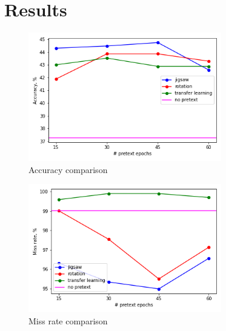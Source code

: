 \section{Results}

\begin{center}

    \begin{figure}[h]
        \centering
        \includegraphics[width=0.75\textwidth]{images/acc}
        \caption{\label{fig:figure-1}Accuracy comparison}
    \end{figure}

    \begin{figure}[h]
        \centering
        \includegraphics[width=0.75\textwidth]{images/miss}
        \caption{\label{fig:figure-2}Miss rate comparison}
    \end{figure}

\end{center}



